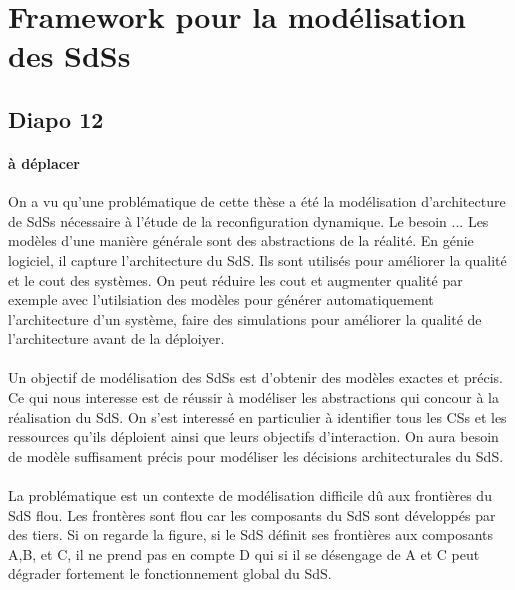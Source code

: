 \section{Framework pour la modélisation des SdSs}

\subsection{Diapo 12}
\paragraph{à déplacer}
On a vu qu'une problématique de cette thèse a été la modélisation
d'architecture de SdSs nécessaire à l'étude de la reconfiguration
dynamique.
%
Le besoin ... 
%
Les modèles d'une manière générale sont des abstractions de la
réalité. 
%
En génie logiciel, il capture l'architecture du SdS. 
Ils sont utilisés pour améliorer la qualité et le cout des systèmes. On
peut réduire les cout et augmenter qualité par exemple avec
l'utilsiation des modèles pour générer automatiquement l'architecture
d'un système, faire des simulations pour améliorer la qualité de
l'architecture avant de la déploiyer. 

\paragraph{}
Un objectif de modélisation des SdSs est d'obtenir des modèles
exactes et précis. 
Ce qui nous interesse est de réussir à modéliser les abstractions qui
concour à la réalisation du SdS. On s'est interessé en particulier à
identifier tous les CSs et les ressources qu'ils déploient ainsi que
leurs objectifs d'interaction.
On aura besoin de modèle suffisament précis pour modéliser les
décisions
architecturales du SdS.

\paragraph{}
La problématique est un contexte de modélisation difficile dû  aux frontières du SdS flou.
Les frontères sont flou car les composants du SdS sont développés par
des tiers. Si on regarde la figure, si le SdS définit ses frontières
aux composants A,B, et C, il ne prend pas en compte D qui si il se
désengage de A et C peut dégrader fortement le fonctionnement global
du SdS.  

